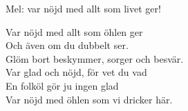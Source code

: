 \begin{SongText}
    \begin{SongInfo}
        Mel: var nöjd med allt som livet ger!
    \end{SongInfo}
    \begin{SongVerse}
        Var nöjd med allt som öhlen ger\\%
        Och även om du dubbelt ser.\\%
        Glöm bort beskymmer, sorger och besvär.\\%
        Var glad och nöjd, för vet du vad\\%
        En folköl gör ju ingen glad\\%
        Var nöjd med öhlen som vi dricker här.
    \end{SongVerse}
\end{SongText}
